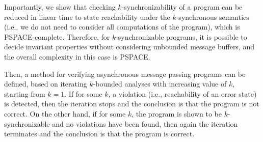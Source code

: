 Importantly, we show that checking $k$-synchronizability of a program can be reduced in linear time to state reachability under the $k$-synchronous semantics (i.e., we do not need to consider all computations of the program), which is PSPACE-complete.
Therefore, for $k$-synchronizable programs, it is possible to decide invariant properties without considering unbounded message buffers, and the overall complexity in this case is PSPACE. 

Then, a method for verifying asynchronous message passing programs can be defined, 
based on iterating $k$-bounded analyses with increasing value of $k$, starting from $k=1$. If for some $k$, a violation (i.e., reachability of an error state) is detected, then the iteration stops and the conclusion is that the program is not correct. On the other hand, if for some $k$, the program is shown to be $k$-synchronizable and no violations have been found, then again the iteration terminates and the conclusion is that the program is correct. 

